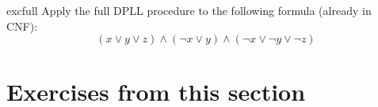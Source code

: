 \begin{restatable}{exc}{full}
Apply the full DPLL procedure to the following formula (already
in CNF):
%
\begin{equation*}
(x \vee y \vee z)
\wedge (\neg x \vee y)
\wedge (\neg x \vee \neg y \vee \neg z)
\end{equation*}
\end{restatable}

\section{Exercises from this section}

%
\unitFoo*
\unitFooTwo*
\pureLiteral*
\split*
\full*
